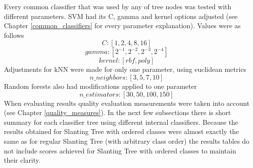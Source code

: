Every common classifier that was used by any of tree nodes was tested with different parameters. SVM had its C, gamma and kernel options adjusted (see Chapter \ref{common_classifiers} for every parameter explanation). Values were as follows \[ C: [ 1, 2, 4, 8, 16 ] \] \[ gamma: [ 2^{-1}, 2^{-2}, 2^{-3}, 2^{-4} ] \]  \[ kernel: [ rbf, poly ] \] 
Adjustments for kNN were made for only one parameter, using euclidean metrics \[ n\_neighbors: [ 3, 5, 7, 10 ] \]
Random forests also had modifications applied to one parameter \[ n\_estimators: [ 30, 50, 100, 150 ] \]
When evaluating results quality evaluation measurements were taken into account (see Chapter \ref{quality_measures}). In the next few subsections there is short summary for each classifier tree using different internal classifiers. Because the results obtained for Slanting Tree with ordered classes were almost exactly the same as for regular Slanting Tree (with arbitrary class order) the results tables do not include scores achieved for Slanting Tree with ordered classes to maintain their clarity.

